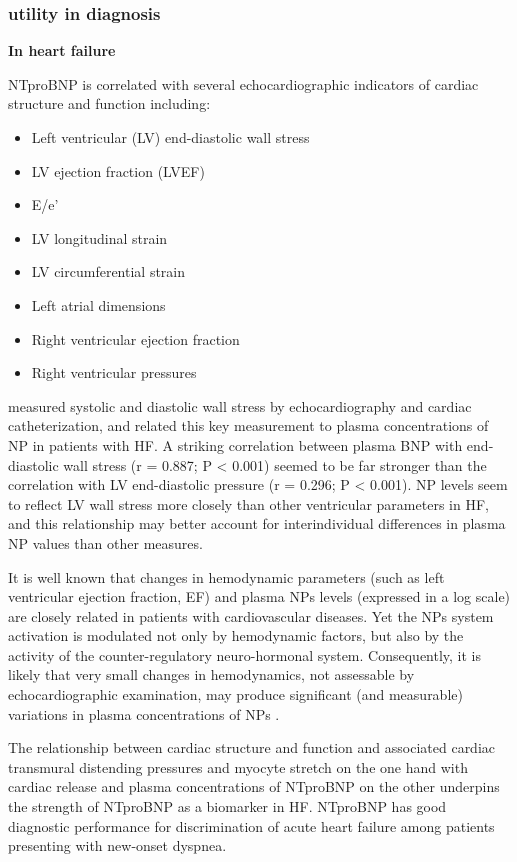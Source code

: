 \documentclass[14pt,a4paper,onecolumn]{extarticle}
\begin{document}
\subsubsection{utility in diagnosis}

\textbf{In heart failure}

NTproBNP is correlated with several echocardiographic indicators of cardiac structure and function including: \begin{itemize}   \item Left ventricular (LV) end-diastolic wall stress   \item LV ejection fraction (LVEF)   \item E/e’   \item LV longitudinal strain   \item LV circumferential strain   \item Left atrial dimensions   \item Right ventricular ejection fraction   \item Right ventricular pressures \end{itemize} \citep{Richards2018}

\citep{Iwanaga2006} measured systolic and diastolic wall stress by echocardiography and cardiac catheterization, and related this key measurement to plasma concentrations of NP in patients with HF. A striking correlation between plasma BNP with end-diastolic wall stress (r = 0.887; P < 0.001) seemed to be far stronger than the correlation with LV end-diastolic pressure (r = 0.296; P < 0.001). NP levels seem to reflect LV wall stress more closely than other ventricular parameters in HF, and this relationship may better account for interindividual differences in plasma NP values than other measures.

It is well known that changes in hemodynamic parameters (such as left ventricular ejection fraction, EF) and plasma NPs levels (expressed in a log scale) are closely related in patients with cardiovascular diseases.  Yet the NPs system activation is modulated not only by hemodynamic factors, but also by the activity of the counter-regulatory neuro-hormonal system. Consequently, it is likely that very small changes in hemodynamics, not assessable by echocardiographic examination, may produce significant (and measurable) variations in plasma concentrations of NPs \citep{bib360}.

The relationship between cardiac structure and function and associated cardiac transmural distending pressures and myocyte stretch on the one hand with cardiac release and plasma concentrations of NTproBNP on the other underpins the strength of NTproBNP as a biomarker in HF. NTproBNP has good diagnostic performance for discrimination of acute heart failure among patients presenting with new-onset dyspnea. \citep{Richards2018}
\end{document}
